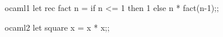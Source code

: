 


    \begin{automarkable}{ocaml}{1}
        let rec fact n =
          if n <= 1 then 1 else n * fact(n-1);;
    \end{automarkable}

    \begin{automarkable}{ocaml}{2}
        let square x = x * x;;
    \end{automarkable}
